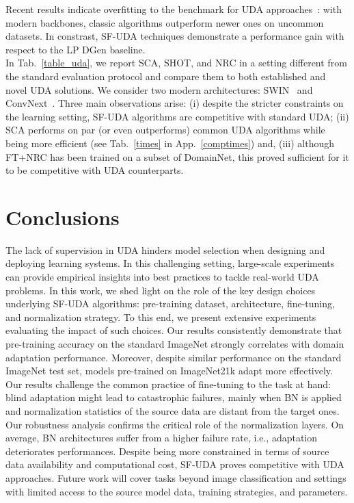 \documentclass{article}
\begin{document}
Recent results indicate overfitting to the benchmark for UDA approaches~\citep{kim2022broad}: with modern backbones, classic algorithms outperform newer ones on uncommon datasets. 
In constrast, SF-UDA techniques demonstrate a performance gain with respect to the LP DGen baseline.\\
In Tab.~\ref{table_uda}, we report SCA, SHOT, and NRC in a setting different from the standard evaluation protocol and compare them to both established and novel UDA solutions. We consider two modern architectures: SWIN~\citep{swin} and ConvNext~\citep{convnext}.
Three main observations arise: (i) despite the stricter constraints on the learning setting, SF-UDA algorithms are competitive with standard UDA; (ii) SCA performs on par (or even outperforms) common UDA algorithms while being
more efficient
(see Tab.~\ref{times} in App.~\ref{comptimes}) and, (iii) although FT+NRC has been trained on a subset of DomainNet, 
this proved sufficient for it to be competitive with UDA counterparts.

\section{Conclusions}
The lack of supervision in UDA hinders model selection when
designing and deploying learning systems.
In this challenging setting, large-scale experiments can provide empirical insights into best practices to tackle real-world UDA problems.
In this work, we shed light on the role of the key design choices underlying SF-UDA algorithms: pre-training dataset, architecture, fine-tuning, and normalization strategy. 
To this end, we present extensive experiments evaluating the impact of such choices.
Our results consistently demonstrate that pre-training accuracy on the standard ImageNet strongly correlates with domain adaptation performance. 
Moreover, despite similar performance on the standard ImageNet test set, models pre-trained on ImageNet21k adapt more effectively. 
Our results challenge the common practice of fine-tuning to the task at hand:
blind adaptation might lead to catastrophic failures, mainly when BN is applied and normalization statistics of the source data are distant from the target ones.
Our robustness analysis confirms the critical role of the normalization layers. 
On average, BN architectures suffer from a higher failure rate, i.e.,  adaptation deteriorates performances. 
Despite being more constrained in terms of source data availability and computational cost, SF-UDA proves competitive with UDA approaches.
Future work will cover tasks beyond image classification and settings with limited access to the source model data, training strategies, and parameters.
\clearpage
\end{document}
